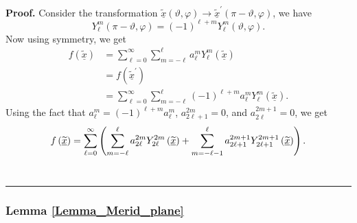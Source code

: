 \documentclass[preprint,11pt,a4paper]{elsarticle}
\newenvironment{proof}[1][Proof]{\noindent\textbf{#1.} }{\ \rule{0.5em}{0.5em}}
\begin{document}
\begin{proof}
Consider the transformation $\underline{\widetilde{x}}\left( \vartheta
,\varphi\right) \rightarrow\underline{\widetilde{x}}^{\prime}\left(
\pi-\vartheta,\varphi\right) $, we have 
\begin{equation*}
Y_{\ell}^{m}\left( \pi-\vartheta,\varphi\right) =\left( -1\right)
^{\ell+m}Y_{\ell}^{m}\left( \vartheta,\varphi\right) .
\end{equation*}
Now using symmetry, we get 
\begin{align*}
f\left( \underline{\widetilde{x}}\right) &
=\sum_{\ell=0}^{\infty}\sum_{m=-\ell}^{\ell}a_{\ell}^{m}Y_{\ell}^{m}\left( 
\underline{\widetilde{x}}\right) \\
& =f\left( \underline{\widetilde{x}}^{\prime}\right) \\
& =\sum_{\ell=0}^{\infty}\sum_{m=-\ell}^{\ell}\left( -1\right) ^{\ell
+m}a_{\ell}^{m}Y_{\ell}^{m}\left( \underline{\widetilde{x}}\right) .
\end{align*}
Using the fact that $a_{\ell}^{m}=\left( -1\right) ^{\ell+m}a_{\ell}^{m}$, $%
a_{2\ell+1}^{2m}=0$, and $a_{2\ell}^{2m+1}=0$, we get 
\begin{equation*}
f\left( \underline{\widetilde{x}}\right) =\sum_{\ell=0}^{\infty}\left(
\sum_{m=-\ell}^{\ell}a_{2\ell}^{2m}Y_{2\ell}^{2m}\left( \underline{%
\widetilde{x}}\right)
+\sum_{m=-\ell-1}^{\ell}a_{2\ell+1}^{2m+1}Y_{2\ell+1}^{2m+1}\left( 
\underline{\widetilde{x}}\right) \right) .
\end{equation*}
\end{proof}

\subsubsection{Lemma \protect\ref{Lemma_Merid_plane}\label{Appendix_Proofs3}}
\end{document}
